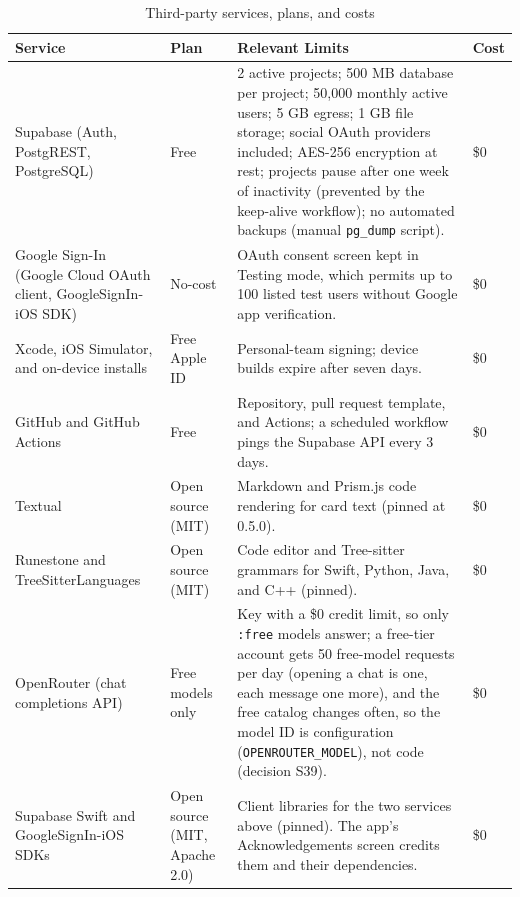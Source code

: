 \documentclass[12pt,letterpaper]{article}
\begin{document}
\begin{table}[H]
\centering
\caption{Third-party services, plans, and costs}
\label{tab:services}
\begin{tabularx}{\textwidth}{@{}L{3.2cm} L{2.4cm} Y l@{}}
\toprule
\textbf{Service} & \textbf{Plan} & \textbf{Relevant Limits} & \textbf{Cost} \\
\midrule
Supabase (Auth, PostgREST, PostgreSQL) & Free & 2 active projects; 500 MB database per project; 50,000 monthly active users; 5 GB egress; 1 GB file storage; social OAuth providers included; AES-256 encryption at rest; projects pause after one week of inactivity (prevented by the keep-alive workflow); no automated backups (manual \texttt{pg\_dump} script). & \$0 \\
Google Sign-In (Google Cloud OAuth client, GoogleSignIn-iOS SDK) & No-cost & OAuth consent screen kept in Testing mode, which permits up to 100 listed test users without Google app verification. & \$0 \\
Xcode, iOS Simulator, and on-device installs & Free Apple ID & Personal-team signing; device builds expire after seven days. & \$0 \\
GitHub and GitHub Actions & Free & Repository, pull request template, and Actions; a scheduled workflow pings the Supabase API every 3 days. & \$0 \\
Textual & Open source (MIT) & Markdown and Prism.js code rendering for card text (pinned at 0.5.0). & \$0 \\
Runestone and TreeSitterLanguages & Open source (MIT) & Code editor and Tree-sitter grammars for Swift, Python, Java, and C++ (pinned). & \$0 \\
OpenRouter (chat completions API) & Free models only & Key with a \$0 credit limit, so only \texttt{:free} models answer; a free-tier account gets 50 free-model requests per day (opening a chat is one, each message one more), and the free catalog changes often, so the model ID is configuration (\texttt{OPENROUTER\_MODEL}), not code (decision S39). & \$0 \\
Supabase Swift and GoogleSignIn-iOS SDKs & Open source (MIT, Apache 2.0) & Client libraries for the two services above (pinned). The app's Acknowledgements screen credits them and their dependencies. & \$0 \\
\bottomrule
\end{tabularx}
\end{table}

\end{document}
